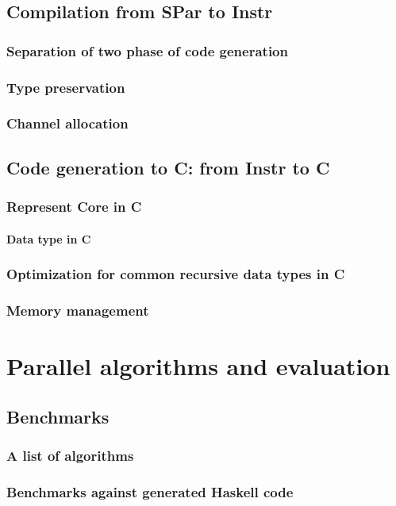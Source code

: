 \documentclass[a4paper, twoside]{report}
\begin{document}
\section{Compilation from SPar to Instr}
\subsection{Separation of two phase of code generation}
\subsection{Type preservation}
\subsection{Channel allocation}
\section{Code generation to C: from Instr to C}
\subsection{Represent Core in C}
\subsubsection{Data type in C}
\subsection{Optimization for common recursive data types in C}
\subsection{Memory management}

% 
\chapter{Parallel algorithms and evaluation}
\section{Benchmarks}
\subsection{A list of algorithms}
\subsection{Benchmarks against generated Haskell code}
\end{document}

